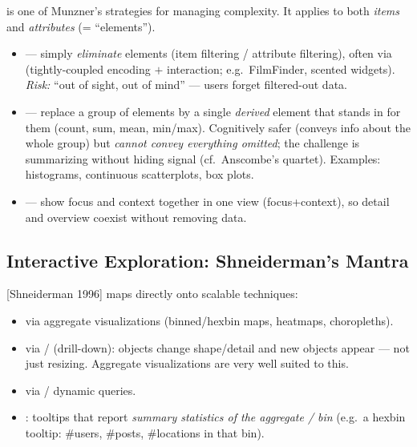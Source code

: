 \begin{keybox}
 is one of Munzner's strategies for managing complexity. It applies
to both \emph{items} and \emph{attributes} (= ``elements'').
\begin{itemize}
  \item {} --- simply \emph{eliminate} elements (item filtering /
        attribute filtering), often via 
        (tightly-coupled encoding $+$ interaction; e.g.\ FilmFinder, scented
        widgets). \emph{Risk:} ``out of sight, out of mind'' --- users forget
        filtered-out data.
  \item {} --- replace a group of elements by a single
        \emph{derived} element that stands in for them (count, sum, mean,
        min/max). Cognitively safer (conveys info about the whole group) but
        \emph{cannot convey everything omitted}; the challenge is summarizing
        without hiding signal (cf.\ Anscombe's quartet). Examples: histograms,
        continuous scatterplots, box plots.
  \item {} --- show focus and context together in one view
        (focus+context), so detail and overview coexist without removing data.
\end{itemize}
\end{keybox}

\subsection{Interactive Exploration: Shneiderman's Mantra}

 [Shneiderman 1996]
maps directly onto scalable techniques:
\begin{itemize}
  \item {} via aggregate visualizations (binned/hexbin maps,
        heatmaps, choropleths).
  \item {} via  /  (drill-down): objects change shape/detail and new objects
        appear --- not just resizing. Aggregate visualizations are very well
        suited to this.
  \item {} via  / dynamic queries.
  \item {}: tooltips that report \emph{summary statistics
        of the aggregate / bin} (e.g.\ a hexbin tooltip: \#users, \#posts,
        \#locations in that bin).
\end{itemize}

